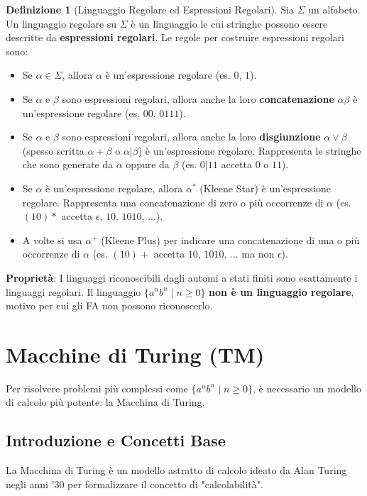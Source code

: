 \documentclass[a4paper]{article}
\theoremstyle{definition} %
\newtheorem{definition}{Definizione}
\begin{document}
\begin{definition}[Linguaggio Regolare ed Espressioni Regolari]
    Sia $\Sigma$ un alfabeto. Un linguaggio regolare su $\Sigma$ è un linguaggio le cui stringhe possono essere descritte da \textbf{espressioni regolari}.
    Le regole per costruire espressioni regolari sono:
    \begin{itemize}
        \item Se $\alpha \in \Sigma$, allora $\alpha$ è un'espressione regolare (es. $0$, $1$).
        \item Se $\alpha$ e $\beta$ sono espressioni regolari, allora anche la loro \textbf{concatenazione} $\alpha\beta$ è un'espressione regolare (es. $00$, $0111$).
        \item Se $\alpha$ e $\beta$ sono espressioni regolari, allora anche la loro \textbf{disgiunzione} $\alpha \lor \beta$ (spesso scritta $\alpha + \beta$ o $\alpha | \beta$) è un'espressione regolare. Rappresenta le stringhe che sono generate da $\alpha$ oppure da $\beta$ (es. $0 | 11$ accetta $0$ o $11$).
        \item Se $\alpha$ è un'espressione regolare, allora $\alpha^*$ (Kleene Star) è un'espressione regolare. Rappresenta una concatenazione di zero o più occorrenze di $\alpha$ (es. $(10)*$ accetta $\epsilon$, $10$, $1010$, ...).
        \item A volte si usa $\alpha^+$ (Kleene Plus) per indicare una concatenazione di una o più occorrenze di $\alpha$ (es. $(10)+$ accetta $10$, $1010$, ... ma non $\epsilon$).
    \end{itemize}
\end{definition}

\textbf{Proprietà}: I linguaggi riconoscibili dagli automi a stati finiti sono esattamente i linguaggi regolari. Il linguaggio $\{a^n b^n \mid n \ge 0\}$ \textbf{non è un linguaggio regolare}, motivo per cui gli FA non possono riconoscerlo.

\section{Macchine di Turing (TM)}
Per risolvere problemi più complessi come $\{a^n b^n \mid n \ge 0\}$, è necessario un modello di calcolo più potente: la Macchina di Turing.

\subsection{Introduzione e Concetti Base}
La Macchina di Turing è un modello astratto di calcolo ideato da Alan Turing negli anni '30 per formalizzare il concetto di "calcolabilità".
\end{document}
